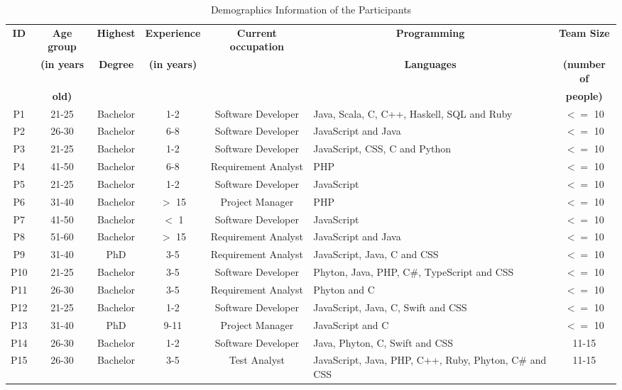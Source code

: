 \documentclass{IEEEcsmag}
\begin{document}
\begin{table}[htb!]
    \centering
    \caption{Demographics Information of the Participants}
    \label{tab:profile}
    \begin{tabular}{|c|c|c|c|c|p{3.0cm}|c|} 
    \hline
    \textbf{ID}  & \textbf{Age group} & \textbf{Highest} & \textbf{Experience} & \textbf{Current occupation} & \multicolumn{1}{c|}{\textbf{Programming}} & \textbf{Team Size} \\ 
      & \textbf{(in years} & \textbf{Degree} & \textbf{(in years)} & & \multicolumn{1}{c|}{\textbf{Languages}}& \textbf{(number of}\\ 
            & \textbf{old)}&  &  & & & \textbf{people)}\\ \hline
P1 & 21-25 & Bachelor & 1-2 & Software Developer & Java, Scala, C, C++, Haskell, SQL and Ruby & $<=$ 10  \\ \hline
P2 & 26-30 & Bachelor & 6-8 & Software Developer &  JavaScript and Java & $<=$ 10  \\ \hline
P3 & 21-25 & Bachelor & 1-2 & Software Developer &  JavaScript, CSS, C and Python & $<=$ 10  \\ \hline
P4 & 41-50 & Bachelor & 6-8 & Requirement Analyst &  PHP & $<=$ 10  \\ \hline
P5 & 21-25 & Bachelor & 1-2 & Software Developer &  JavaScript & $<=$ 10  \\ \hline
P6 & 31-40 & Bachelor & $>$ 15 & Project Manager &  PHP & $<=$ 10  \\ \hline
P7 & 41-50 & Bachelor & $<$ 1 & Software Developer &  JavaScript & $<=$ 10  \\ \hline
P8 & 51-60 & Bachelor & $>$ 15 & Requirement Analyst &  JavaScript and Java & $<=$ 10  \\ \hline
P9 & 31-40 & PhD & 3-5 & Requirement Analyst &  JavaScript, Java, C and CSS & $<=$ 10  \\ \hline
P10 & 21-25 & Bachelor & 3-5 & Software Developer & Phyton, Java, PHP, C\#, TypeScript and CSS & $<=$ 10  \\ \hline
P11 & 26-30 & Bachelor & 3-5 & Requirement Analyst & Phyton and C & $<=$ 10  \\ \hline
P12 & 21-25 & Bachelor & 1-2 & Software Developer & JavaScript, Java, C, Swift and CSS & $<=$ 10  \\ \hline
P13 & 31-40 & PhD & 9-11 & Project Manager & JavaScript and C & $<=$ 10  \\ \hline
P14 & 26-30 & Bachelor & 1-2 & Software Developer & Java, Phyton, C, Swift and CSS & 11-15  \\ \hline
P15 & 26-30 & Bachelor & 3-5 & Test Analyst & JavaScript, Java, PHP, C++, Ruby, Phyton, C\# and CSS & 11-15 \\ \hline
        \end{tabular}
\end{table}
\end{document}

